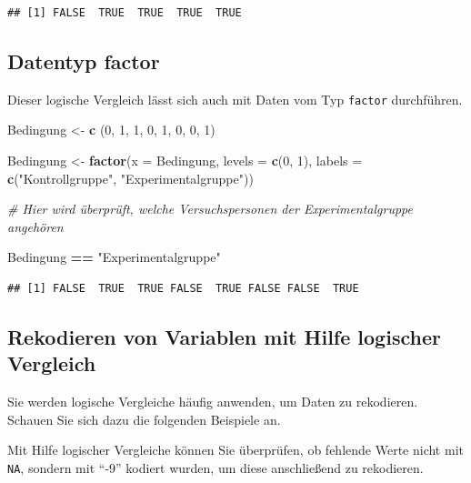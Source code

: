 \documentclass[
  ngerman,
]{book}
\newenvironment{Shaded}{\begin{snugshade}}{\end{snugshade}}
\newcommand{\AttributeTok}[1]{\textcolor[rgb]{0.13,0.29,0.53}{#1}}
\newcommand{\CommentTok}[1]{\textcolor[rgb]{0.56,0.35,0.01}{\textit{#1}}}
\newcommand{\DecValTok}[1]{\textcolor[rgb]{0.00,0.00,0.81}{#1}}
\newcommand{\FunctionTok}[1]{\textcolor[rgb]{0.13,0.29,0.53}{\textbf{#1}}}
\newcommand{\NormalTok}[1]{#1}
\newcommand{\OtherTok}[1]{\textcolor[rgb]{0.56,0.35,0.01}{#1}}
\newcommand{\SpecialCharTok}[1]{\textcolor[rgb]{0.81,0.36,0.00}{\textbf{#1}}}
\newcommand{\StringTok}[1]{\textcolor[rgb]{0.31,0.60,0.02}{#1}}
\begin{document}
\begin{verbatim}
## [1] FALSE  TRUE  TRUE  TRUE  TRUE
\end{verbatim}

\subsection{Datentyp factor}\label{datentyp-factor-1}

Dieser logische Vergleich lässt sich auch mit Daten vom Typ \texttt{factor} durchführen.

\begin{Shaded}
\begin{Highlighting}[]
\NormalTok{Bedingung }\OtherTok{\textless{}{-}} \FunctionTok{c}\NormalTok{ (}\DecValTok{0}\NormalTok{, }\DecValTok{1}\NormalTok{, }\DecValTok{1}\NormalTok{, }\DecValTok{0}\NormalTok{, }\DecValTok{1}\NormalTok{, }\DecValTok{0}\NormalTok{, }\DecValTok{0}\NormalTok{, }\DecValTok{1}\NormalTok{)}

\NormalTok{Bedingung }\OtherTok{\textless{}{-}} \FunctionTok{factor}\NormalTok{(}\AttributeTok{x =}\NormalTok{ Bedingung, }
                        \AttributeTok{levels =} \FunctionTok{c}\NormalTok{(}\DecValTok{0}\NormalTok{, }\DecValTok{1}\NormalTok{),}
                        \AttributeTok{labels =} \FunctionTok{c}\NormalTok{(}\StringTok{"Kontrollgruppe"}\NormalTok{, }\StringTok{"Experimentalgruppe"}\NormalTok{))}

\CommentTok{\# Hier wird überprüft, welche Versuchspersonen der Experimentalgruppe angehören}

\NormalTok{Bedingung }\SpecialCharTok{==} \StringTok{"Experimentalgruppe"}
\end{Highlighting}
\end{Shaded}

\begin{verbatim}
## [1] FALSE  TRUE  TRUE FALSE  TRUE FALSE FALSE  TRUE
\end{verbatim}

\subsection{Rekodieren von Variablen mit Hilfe logischer Vergleich}\label{rekodieren-von-variablen-mit-hilfe-logischer-vergleich}

Sie werden logische Vergleiche häufig anwenden, um Daten zu rekodieren. Schauen Sie sich dazu die folgenden Beispiele an.

Mit Hilfe logischer Vergleiche können Sie überprüfen, ob fehlende Werte nicht mit \texttt{NA}, sondern mit ``-9'' kodiert wurden, um diese anschließend zu rekodieren.
\end{document}

